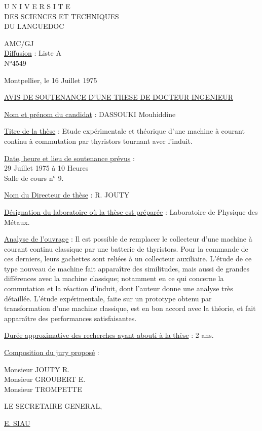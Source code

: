 U N I V E R S I T E\\
DES SCIENCES ET TECHNIQUES\\
DU LANGUEDOC


AMC/GJ\\
\uline{Diffusion} : Liste A\\
N°4549

Montpellier, le 16 Juillet 1975

\uline{AVIS DE SOUTENANCE D'UNE THESE DE DOCTEUR-INGENIEUR}

\uline{Nom et prénom du candidat} : DASSOUKI Mouhiddine

\uline{Titre de la thèse} : Etude expérimentale et théorique d'une machine à courant continu à commutation par thyristors tournant avec l'induit.

\uline{Date, heure et lieu de soutenance prévus} :\\
29 Juillet 1975 à 10 Heures\\
Salle de cours n° 9.

\uline{Nom du Directeur de thèse} : R. JOUTY

\uline{Désignation du laboratoire où la thèse est préparée} : Laboratoire de Physique des Métaux.

\uline{Analyse de l'ouvrage} : Il est possible de remplacer le collecteur d'une machine à courant continu classique par une batterie de thyristors. Pour la commande de ces derniers, leurs gachettes sont reliées à un collecteur auxiliaire. L'étude de ce type nouveau de machine fait apparaître des similitudes, mais aussi de grandes différences avec la machine classique; notamment en ce qui concerne la commutation et la réaction d'induit, dont l'auteur donne une analyse très détaillée. L'étude expérimentale, faite sur un prototype obtenu par transformation d'une machine classique, est en bon accord avec la théorie, et fait apparaître des performances satisfaisantes.

\uline{Durée approximative des recherches ayant abouti à la thèse} : 2 ans.

\uline{Composition du jury proposé} :

Monsieur JOUTY R.\\
Monsieur GROUBERT E.\\
Monsieur TROMPETTE

LE SECRETAIRE GENERAL,


\uline{E. SIAU}

